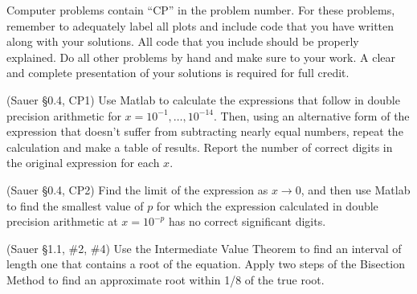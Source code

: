 \documentclass[12pt,fleqn]{exam}
\begin{document}
Computer problems contain ``CP'' in the problem number. For these problems, remember to adequately label all plots and include code that you have written along with your solutions. All code that you include should be properly explained. Do all other problems by hand and make sure to your work. A clear and complete presentation of your solutions is required for full credit.

\begin{questions}

\question (Sauer \S0.4, CP1) Use Matlab to calculate the expressions that follow in double precision arithmetic for $x = 10^{-1}, \dots, 10^{-14}$. Then, using an alternative form of the expression that doesn't suffer from subtracting nearly equal numbers, repeat the calculation and make a table of results. Report the number of correct digits in the original expression for each $x$.


\question (Sauer \S0.4, CP2) Find the limit of the expression as $x \rightarrow 0$, and then use Matlab to find the smallest value of $p$ for which the expression calculated in double precision arithmetic at $x = 10^{-p}$ has no correct significant digits.


\question (Sauer \S1.1, \#2, \#4) Use the Intermediate Value Theorem to find an interval of length one that contains a root of the equation. Apply two steps of the Bisection Method to find an approximate root within 1/8 of the true root.


\end{questions}
\end{document}
